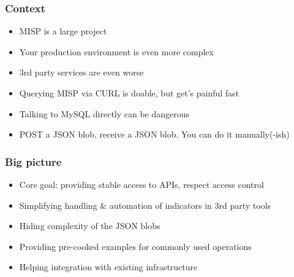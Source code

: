 


\begin{frame}[t,plain]
\titlepage
\end{frame}

\begin{frame}
    \frametitle{Context}
    \begin{itemize}
        \item MISP is a large project
        \item Your production environment is even more complex
        \item 3rd party services are even worse
        \item Querying MISP via CURL is doable, but get's painful fast
        \item Talking to MySQL directly can be dangerous
        \item POST a JSON blob, receive a JSON blob. You can do it manually(-ish)
    \end{itemize}
\end{frame}

\begin{frame}
    \frametitle{Big picture}
    \begin{itemize}
        \item Core goal: providing stable access to APIs, respect access control
        \item Simplifying handling \& automation of indicators in 3rd party tools
        \item Hiding complexity of the JSON blobs
        \item Providing pre-cooked examples for commonly used operations
        \item Helping integration with existing infrastructure
    \end{itemize}
\end{frame}

